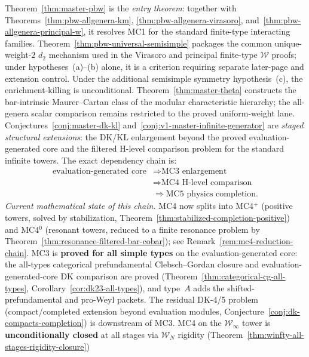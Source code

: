 \begin{remark}\label{rem:master-conjecture-hierarchy}
Theorem~\ref{thm:master-pbw} is the \emph{entry theorem}: together
with Theorems~\ref{thm:pbw-allgenera-km},
\ref{thm:pbw-allgenera-virasoro},
and~\ref{thm:pbw-allgenera-principal-w},
it resolves MC1 for the standard finite-type interacting families.
Theorem~\ref{thm:pbw-universal-semisimple} packages the common
unique-weight-$2$ $d_2$ mechanism used in the Virasoro and principal
finite-type $\mathcal{W}$ proofs; under hypotheses~(a)--(b) alone, it
is a criterion requiring separate later-page and
extension control. Under the additional semisimple symmetry
hypothesis~(c), the enrichment-killing is unconditional.
Theorem~\ref{thm:master-theta} constructs the bar-intrinsic
Maurer--Cartan class of the modular characteristic hierarchy; the
all-genera scalar comparison remains restricted to the proved
uniform-weight lane.
Conjectures~\ref{conj:master-dk-kl}
and~\ref{conj:v1-master-infinite-generator} are
\emph{staged structural extensions}: the DK/KL enlargement beyond the
proved evaluation-generated core and the filtered H-level
comparison problem for the
standard infinite towers.
The exact dependency chain is:
\[
\begin{aligned}
\text{evaluation-generated core}
&\Longrightarrow \text{MC3 enlargement}\\
&\Longrightarrow \text{MC4 H-level comparison}\\
&\Longrightarrow \text{MC5 physics completion}.
\end{aligned}
\]
\emph{Current mathematical state of this chain.}
MC4 now splits into MC4$^+$ (positive towers, solved by
stabilization, Theorem~\ref{thm:stabilized-completion-positive})
and MC4$^0$ (resonant towers, reduced to a finite resonance problem
by Theorem~\ref{thm:resonance-filtered-bar-cobar}); see
Remark~\ref{rem:mc4-reduction-chain}.
MC3 is \textbf{proved for all simple types} on the evaluation-generated
core: the all-types categorical
prefundamental Clebsch--Gordan closure and evaluation-generated-core
DK comparison are proved
\textup{(}Theorem~\ref{thm:categorical-cg-all-types},
Corollary~\ref{cor:dk23-all-types}\textup{)}, and type~$A$ adds the
shifted-prefundamental and pro-Weyl packets. The residual DK-4/5
problem (compact/completed extension beyond evaluation modules,
Conjecture~\ref{conj:dk-compacts-completion}) is downstream of MC3.
MC4 on the $\mathcal{W}_\infty$ tower is
\textbf{unconditionally closed} at all stages via
$\mathcal{W}_N$ rigidity
(Theorem~\ref{thm:winfty-all-stages-rigidity-closure})

\end{remark}
